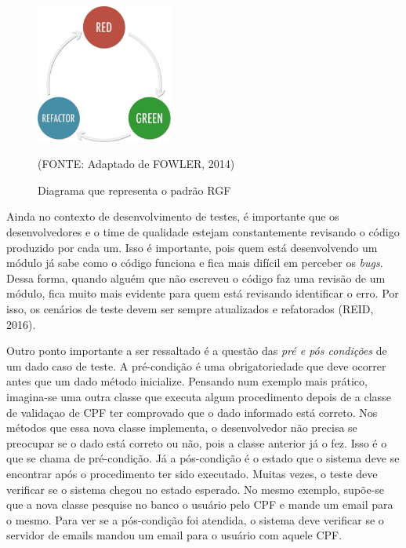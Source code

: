 \documentclass[
    12pt,       %
    openright,      %
    twoside,      %
    a4paper,      %
    english,      %
    french,       %
    spanish,      %
    brazil,       %
    ]{abntex2}
\begin{document}
      \begin{figure}[htbp]
          \begin{center}
              \includegraphics[width=0.4\textwidth]{img/rgf.png}
          \end{center}
          \caption{\label{fig:passaro}Diagrama que representa o padrão RGF}
          \begin{center}(FONTE: Adaptado de FOWLER, 2014)\end{center}
      \end{figure}

      Ainda no contexto de desenvolvimento de testes, é importante que os desenvolvedores
      e o time de qualidade estejam constantemente revisando o código produzido por
      cada um. Isso é importante, pois quem está desenvolvendo um módulo já sabe como
      o código funciona e fica mais difícil em perceber os \textit{bugs}. Dessa forma,
      quando alguém que não escreveu o código faz uma revisão de um módulo, fica
      muito mais evidente para quem está revisando identificar o erro. Por isso,
      os cenários de teste devem ser sempre atualizados e refatorados (REID, 2016).

      Outro ponto importante a ser ressaltado é a questão das \textit{pré e pós condições} de
      um dado caso de teste. A pré-condição é uma obrigatoriedade que deve ocorrer
      antes que um dado método inicialize. Pensando num exemplo mais prático,
      imagina-se uma outra classe que executa algum procedimento depois de a classe
      de validaçao de CPF ter comprovado que o dado informado está correto. Nos métodos
      que essa nova classe implementa, o desenvolvedor não precisa se preocupar se o
      dado está correto ou não, pois a classe anterior já o fez. Isso é o que se chama
      de pré-condição. Já a pós-condição é o estado que o sistema deve se encontrar
      após o procedimento ter sido executado. Muitas vezes, o teste deve verificar
      se o sistema chegou no estado esperado. No mesmo exemplo, supõe-se que a nova
      classe pesquise no banco o usuário pelo CPF e mande um email para o mesmo. Para
      ver se a pós-condição foi atendida, o sistema deve verificar se o servidor de
      emails mandou um email para o usuário com aquele CPF.
\end{document}
